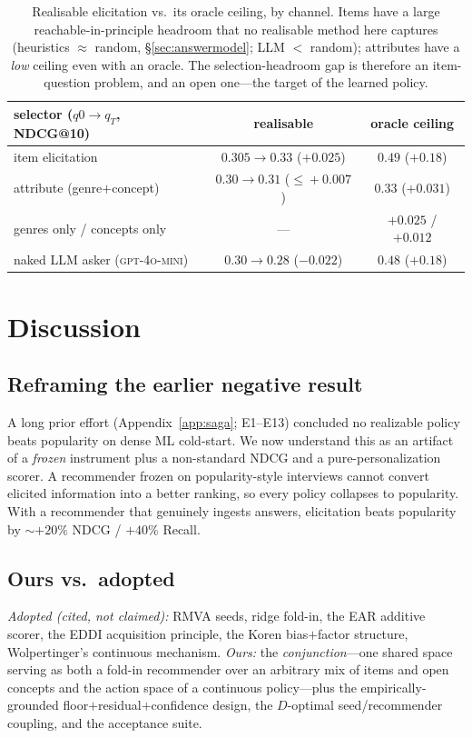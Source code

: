 \begin{table}[h]\centering\small
\begin{tabular}{lcc}
\toprule
selector ($q0\!\to\!q_T$, NDCG@10) & realisable & oracle ceiling\\
\midrule
item elicitation & $0.305\to0.33$ ($+0.025$) & $\mathbf{0.49}$ ($\mathbf{+0.18}$)\\
attribute (genre$+$concept) & $0.30\to0.31$ ($\le\!+0.007$) & $0.33$ ($+0.031$)\\
\quad genres only / concepts only & --- & $+0.025$ / $+0.012$\\
naked LLM asker (\textsc{gpt-4o-mini}) & $0.30\to0.28$ ($-0.022$) & $0.48$ ($+0.18$)\\
\bottomrule
\end{tabular}
\caption{Realisable elicitation vs.\ its oracle ceiling, by channel. Items have a large reachable-in-principle
headroom that no realisable method here captures (heuristics $\approx$ random, \S\ref{sec:answermodel}; LLM $<$ random);
attributes have a \emph{low} ceiling even with an oracle. The selection-headroom gap is therefore an item-question
problem, and an open one---the target of the learned policy.}
\label{tab:askers}
\end{table}

\section{Discussion}\label{sec:disc}

\subsection{Reframing the earlier negative result}
A long prior effort (Appendix~\ref{app:saga}; E1--E13) concluded no realizable policy beats popularity on dense ML
cold-start. We now understand this as an artifact of a \emph{frozen} instrument plus a non-standard NDCG and a
pure-personalization scorer. A recommender frozen on popularity-style interviews cannot convert elicited
information into a better ranking, so every policy collapses to popularity. With a recommender that genuinely
ingests answers, elicitation beats popularity by ${\sim}{+}20\%$ NDCG / ${+}40\%$ Recall.

\subsection{Ours vs.\ adopted}
\emph{Adopted (cited, not claimed):} RMVA seeds, ridge fold-in, the EAR additive scorer, the EDDI acquisition
principle, the Koren bias$+$factor structure, Wolpertinger's continuous mechanism. \emph{Ours:} the
\emph{conjunction}---one shared space serving as both a fold-in recommender over an arbitrary mix of items and open
concepts and the action space of a continuous policy---plus the empirically-grounded floor$+$residual$+$confidence
design, the $D$-optimal seed/recommender coupling, and the acceptance suite.

